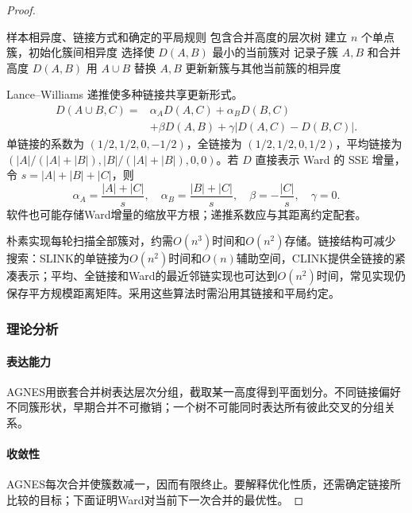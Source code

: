 \begin{proof}
\begin{algorithm}[凝聚层次聚类]
 \label{alg:clustering-agnes}
 \begin{algorithmic}[1]
 \Require 样本相异度、链接方式和确定的平局规则
 \Ensure 包含合并高度的层次树
 \State 建立 $n$ 个单点簇，初始化簇间相异度
  \State 选择使 $D(A,B)$ 最小的当前簇对
  \State 记录子簇 $A,B$ 和合并高度 $D(A,B)$
  \State 用 $A\cup B$ 替换 $A,B$
  \State 更新新簇与其他当前簇的相异度
 \EndWhile
 \end{algorithmic}
\end{algorithm}

Lance--Williams 递推使多种链接共享更新形式。
\begin{equation}
 \begin{aligned}
 D(A\cup B,C)={}&\alpha_A D(A,C)+\alpha_B D(B,C)\\
 &+\beta D(A,B)
 +\gamma|D(A,C)-D(B,C)|.
 \end{aligned}
 \label{eq:clustering-lance-williams}
\end{equation}
单链接的系数为 $(1/2,1/2,0,-1/2)$，全链接为 $(1/2,1/2,0,1/2)$，平均链接为 $(|A|/(|A|+|B|),|B|/(|A|+|B|),0,0)$。若 $D$ 直接表示 Ward 的 SSE 增量，令 $s=|A|+|B|+|C|$，则
\[
 \alpha_A=\frac{|A|+|C|}{s},\quad
 \alpha_B=\frac{|B|+|C|}{s},\quad
 \beta=-\frac{|C|}{s},\quad \gamma=0.
\]
软件也可能存储Ward增量的缩放平方根；递推系数应与其距离约定配套。

朴素实现每轮扫描全部簇对，约需$O(n^3)$时间和$O(n^2)$存储。链接结构可减少搜索：SLINK的单链接为$O(n^2)$时间和$O(n)$辅助空间，CLINK提供全链接的紧凑表示；平均、全链接和Ward的最近邻链实现也可达到$O(n^2)$时间，常见实现仍保存平方规模距离矩阵。采用这些算法时需沿用其链接和平局约定。

\subsubsection{理论分析}

\paragraph{表达能力}
AGNES用嵌套合并树表达层次分组，截取某一高度得到平面划分。不同链接偏好不同簇形状，早期合并不可撤销；一个树不可能同时表达所有彼此交叉的分组关系。

\paragraph{收敛性}
AGNES每次合并使簇数减一，因而有限终止。要解释优化性质，还需确定链接所比较的目标；下面证明Ward对当前下一次合并的最优性。


\end{proof}
